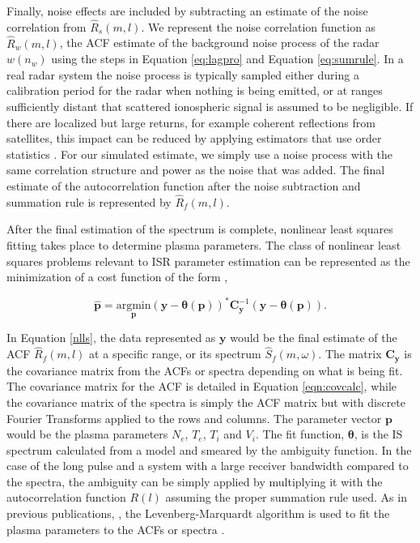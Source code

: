 \documentclass[draft,ras]{agutex}
\begin{document}
\begin{article}
Finally, noise effects are included by subtracting an estimate of the noise correlation from $\widehat{R}_s(m,l)$.  We represent the noise correlation function as $\widehat{R}_w(m,l)$, the ACF estimate of the background noise process of the radar $w(n_w)$ using the steps in Equation \ref{eq:lagpro} and Equation \ref{eq:sumrule}. In a real radar system the noise process is typically sampled either during a calibration period for the radar when nothing is being emitted, or at ranges sufficiently distant that scattered ionospheric signal is assumed to be negligible. If there are localized but large returns, for example coherent reflections from satellites, this impact can be reduced by applying estimators that use order statistics \citep{ordstatcfar}. For our simulated estimate, we simply use a noise process with the same correlation structure and power as the noise that was added. The final estimate of the autocorrelation function after the noise subtraction and summation rule is represented by $\widehat{R}_f(m,l)$. 


After the final estimation of the spectrum is complete, nonlinear least squares fitting takes place to determine plasma parameters. The class of nonlinear least squares problems relevant to ISR parameter estimation can be represented as the minimization of a cost function of the form \citep{kayvol1},

\begin{equation}
	\mathbf{\hat{p}}= \underset{\mathbf{p}}{\text{argmin}} (\mathbf{y}-\bm{\theta}(\mathbf{p}))^*\mathbf{C}_{\mathbf{y}}^{-1}(\mathbf{y}-\bm{\theta}(\mathbf{p})).
\label{nlls}
\end{equation}

In Equation \ref{nlls}, the data represented as $\mathbf{y}$ would be the final estimate of the ACF $\widehat{R}_f(m,l)$ at a specific range, or its spectrum $\widehat{S}_f(m,\omega)$. The matrix $\mathbf{C}_{\mathbf{y}}$  is the covariance matrix from the ACFs or spectra depending on what is being fit. The covariance matrix for the ACF is detailed in Equation \ref{eqn:covcalc}, while the covariance matrix of the spectra is simply the ACF matrix but with discrete Fourier Transforms applied to the rows and columns. The parameter vector $\mathbf{p}$ would be the plasma parameters $N_e$, $T_e$, $T_i$ and $V_i$. The fit function, $\bm{\theta}$, is the IS spectrum calculated from a model \citep[e.g.,][]{kudeki:milla:1} and smeared by the ambiguity function.  In the case of the long pulse and a system with a large receiver bandwidth compared to the spectra, the ambiguity can be simply applied by multiplying it with the autocorrelation function $R(l)$ assuming the proper summation rule used. As in previous publications, \citep[e.g.,][]{nikoukar2008}, the Levenberg-Marquardt algorithm is used to fit the plasma parameters to the ACFs or spectra \citep{levenberg1944,marquardt:1963}.


\end{article}
\end{document}
